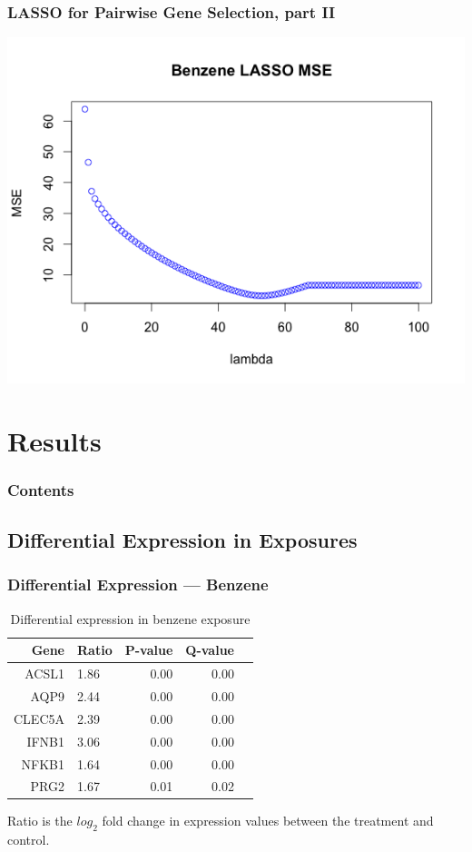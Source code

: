 \documentclass{beamer}
\begin{document}
\begin{frame}[fragile]
        \frametitle{LASSO for Pairwise Gene Selection, part II}
		\centering
                \includegraphics[scale=0.5]{../paper/figs/lasso_mse.png} 
\end{frame}

\section{Results}

\begin{frame}
        \frametitle{Contents}
        \tableofcontents[currentsection,currentsubsection,hideothersubsections,sectionstyle=show/shaded]
\end{frame}

\subsection{Differential Expression in Exposures}

\begin{frame}[fragile]
  	\frametitle{Differential Expression --- Benzene}
 		\begin{table}[ht]
		\caption {Differential expression in benzene exposure} \label{tab:benzene} 
		\centering
		\begin{tabular}{rlrrr}
  			\hline
 			Gene & Ratio & P-value & Q-value \\ 
  			\hline
			ACSL1 & 1.86 & 0.00 & 0.00 \\ 
  			AQP9 & 2.44 & 0.00 & 0.00 \\ 
  			CLEC5A & 2.39 & 0.00 & 0.00 \\ 
  			IFNB1 & 3.06 & 0.00 & 0.00 \\ 
  			NFKB1 & 1.64 & 0.00 & 0.00 \\ 
  			PRG2 & 1.67 & 0.01 & 0.02 \\ 
   			\hline
		\end{tabular}
		\end{table}
		\small Ratio is the $log_{2}$ fold change in expression values between the treatment and control. 
\end{frame}
\end{document}

